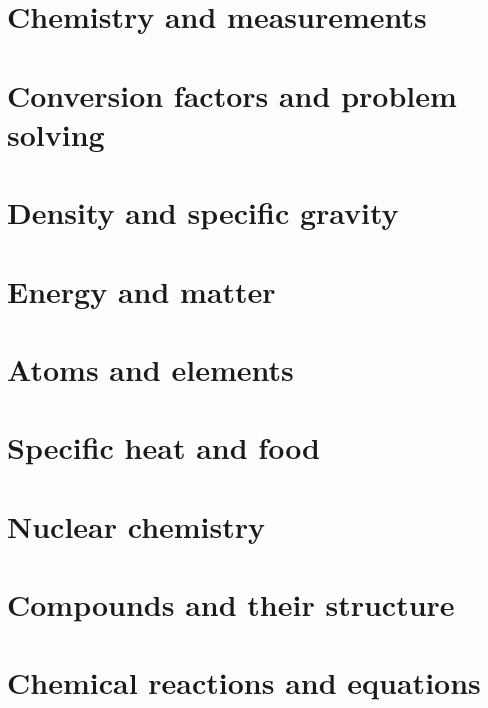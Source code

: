 		 
\newpage\section{ Chemistry and measurements   }\clearpage\mbox{}\clearpage 
 \newpage\section{ Conversion factors and problem solving   }\clearpage\mbox{}\clearpage 
\newpage \section{  Density and specific gravity  }\clearpage\mbox{}\clearpage 
 \newpage\section{ Energy and matter   }\clearpage\mbox{}\clearpage 
  \newpage\section{  Atoms and elements  }\clearpage\mbox{}\clearpage 
 \newpage\section{  Specific heat and food  }\clearpage\mbox{}\clearpage 
 \newpage\section{  Nuclear chemistry  }\clearpage\mbox{}\clearpage 
 \newpage\section{  Compounds and their structure  }\clearpage\mbox{}\clearpage 
   \newpage\section{  Chemical reactions and equations  }\clearpage\mbox{}\clearpage 

